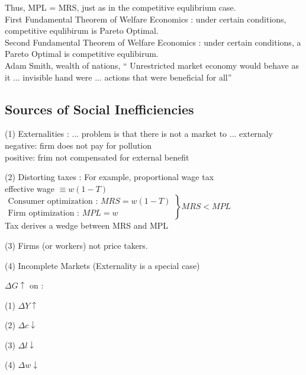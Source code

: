 Thus, MPL = MRS, just as in the competitive equlibrium case.\\

First Fundamental Theorem of Welfare Economics : under certain conditions, competitive equlibirum is Pareto Optimal.\\

Second Fundamental Theorem of Welfare Economics : under certain conditions, a Pareto Optimal is competitive equlibirum.\\

Adam Smith, wealth of nations, `` Unrestricted market economy would behave as it ... invisible hand were ... actions that were beneficial for all''\\

\subsection*{Sources of Social Inefficiencies}
\begin{list}{}{}
\item (1) Externalities : ... problem is that there is not a market to ... externaly\\
negative: firm does not pay for pollution\\
positive: frim not compensated for external benefit\\
\item (2) Distorting taxes : For example, proportional wage tax\\
effective wage $\equiv w(1-T)$\\
$\left. 
\begin{array}{ll}
\mbox{Consumer optimization : $MRS = w(1-T)$}\\
\mbox{Firm optimization : $MPL = w$}
\end{array} 
\right\}\mbox{$MRS < MPL$} $ \\

Tax derives a wedge between MRS and MPL\\

\item (3) Firms (or workers) not price takers.\\
\item (4) Incomplete Markets (Externality is a special case)\\
\end{list}

$\Delta G\uparrow $ on : \\
\begin{list}{}{}
\item (1) $\Delta Y \uparrow$
\item (2) $\Delta c \downarrow$
\item (3) $\Delta l \downarrow$
\item (4) $\Delta w \downarrow$
\end{list}

